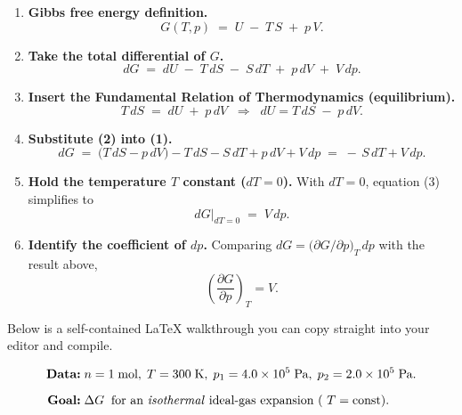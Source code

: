 \documentclass[12pt]{article}
\theoremstyle{definition} %
\theoremstyle{plain} %
\begin{document}
          \begin{enumerate}
          \item \textbf{Gibbs free energy definition.}
                \[
                  G(T,p)\;=\; U \;-\; T\,S \;+\; p\,V .
                \]
          
          \item \textbf{Take the total differential of \(G\).}
                \[
                  dG
                  \;=\;
                  dU \;-\; T\,dS \;-\; S\,dT \;+\; p\,dV \;+\; V\,dp .
                  \tag{1}
                \]
          
          \item \textbf{Insert the Fundamental Relation of Thermodynamics (equilibrium).}
                \[
                  T\,dS \;=\; dU \;+\; p\,dV
                  \;\;\Longrightarrow\;\;
                  dU = T\,dS \;-\; p\,dV .
                  \tag{2}
                \]
          
          \item \textbf{Substitute (2) into (1).}
                \[
                  dG
                  \;=\;
                  \bigl(T\,dS - p\,dV\bigr)
                  - T\,dS
                  - S\,dT
                  + p\,dV
                  + V\,dp
                  \;=\;
                  -\,S\,dT
                  + V\,dp .
                  \tag{3}
                \]
          
          \item \textbf{Hold the temperature \(T\) constant (\(dT = 0\)).}
                With \(dT = 0\), equation (3) simplifies to
                \[
                  dG\big|_{dT=0} \;=\; V\,dp .
                \]
          
          \item \textbf{Identify the coefficient of \(dp\).}
                Comparing \(dG = \bigl(\partial G/\partial p\bigr)_T\,dp\) with the result above,
                \[
                  \boxed{\displaystyle
                    \left(\frac{\partial G}{\partial p}\right)_T = V } .
                \]
          \end{enumerate}
          Below is a self-contained LaTeX walkthrough you can copy straight into your editor and compile.

\begin{align*}
\textbf{Data:}\;
&n = 1\;\text{mol},\;
T = 300\;\text{K},\;
p_1 = 4.0 \times 10^{5}\;\text{Pa},\;
p_2 = 2.0 \times 10^{5}\;\text{Pa}. \\[6pt]
\textbf{Goal:}\;
&\Delta G \;\;\text{for an \emph{isothermal} ideal-gas expansion ( } T=\text{const}\text{).}
\end{align*}
\end{document}
